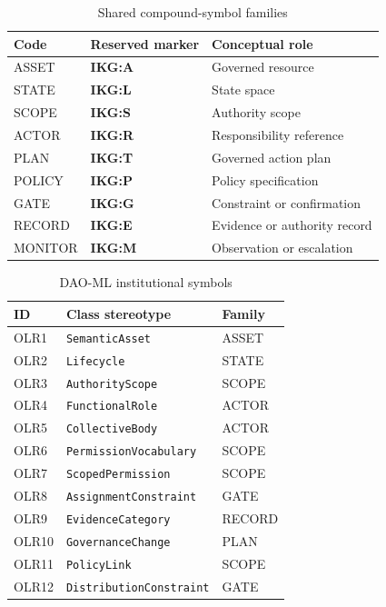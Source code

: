 \documentclass[journal]{IEEEtran}
\begin{document}
\begin{table}[!ht]
\centering
\caption{Shared compound-symbol families}
\label{tab:notation_families}
\small
\setlength{\tabcolsep}{3pt}
\begin{tabular}{p{}p{}p{}}
\hline
\textbf{Code} & \textbf{Reserved marker} & \textbf{Conceptual role}\\
\hline
ASSET & \textsf{\bfseries IKG:A} & Governed resource\\
STATE & \textsf{\bfseries IKG:L} & State space\\
SCOPE & \textsf{\bfseries IKG:S} & Authority scope\\
ACTOR & \textsf{\bfseries IKG:R} & Responsibility reference\\
PLAN & \textsf{\bfseries IKG:T} & Governed action plan\\
POLICY & \textsf{\bfseries IKG:P} & Policy specification\\
GATE & \textsf{\bfseries IKG:G} & Constraint or confirmation\\
RECORD & \textsf{\bfseries IKG:E} & Evidence or authority record\\
MONITOR & \textsf{\bfseries IKG:M} & Observation or escalation\\
\hline
\end{tabular}
\end{table}

\begin{table}[!ht]
\centering
\caption{DAO-ML institutional symbols}
\label{tab:dao_notation_symbols}
\footnotesize
\begin{tabular}{lll}
\hline
\textbf{ID} & \textbf{Class stereotype} & \textbf{Family}\\
\hline
OLR1 & \texttt{SemanticAsset} & ASSET\\
OLR2 & \texttt{Lifecycle} & STATE\\
OLR3 & \texttt{AuthorityScope} & SCOPE\\
OLR4 & \texttt{FunctionalRole} & ACTOR\\
OLR5 & \texttt{CollectiveBody} & ACTOR\\
OLR6 & \texttt{PermissionVocabulary} & SCOPE\\
OLR7 & \texttt{ScopedPermission} & SCOPE\\
OLR8 & \texttt{AssignmentConstraint} & GATE\\
OLR9 & \texttt{EvidenceCategory} & RECORD\\
OLR10 & \texttt{GovernanceChange} & PLAN\\
OLR11 & \texttt{PolicyLink} & SCOPE\\
OLR12 & \texttt{DistributionConstraint} & GATE\\
\hline
\end{tabular}
\end{table}
\end{document}
